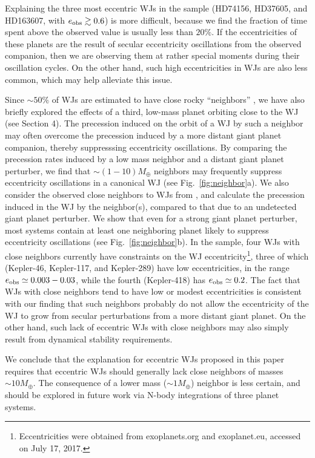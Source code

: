 \documentclass[12pt,useAMS, usenatbib]{mn2e}
\newcommand{\eobs}{e_{\rm obs}}
\begin{document}
Explaining the three most eccentric WJs in the sample (HD74156, HD37605, and HD163607, with $\eobs \gtrsim 0.6$) is more difficult, because we find the fraction of time spent above the observed value is usually less than $20 \%$.  If the eccentricities of these planets are the result of secular eccentricity oscillations from the observed companion, then we are observing them at rather special moments during their oscillation cycles.  On the other hand, such high eccentricities in WJs are also less common, which may help alleviate this issue. 

Since $\sim 50 \%$ of WJs are estimated to have close rocky ``neighbors'' \citep{huang2016},  we have also briefly explored the effects of a third, low-mass planet orbiting close to the WJ (see Section 4).  The precession induced on the orbit of a WJ by such a neighbor may often overcome the precession induced by a more distant giant planet companion, thereby suppresssing eccentricity oscillations.  By comparing the precession rates induced by a low mass neighbor and a distant giant planet perturber, we find that $\sim (1 - 10) M_{\oplus}$ neighbors may frequently suppress eccentricity oscillations in a canonical WJ (see Fig.~\ref{fig:neighbor}a).  We also consider the observed close neighbors to WJs from \cite{huang2016},  and calculate the precession induced in the WJ by the neighbor(s), compared to that due to an undetected giant planet perturber.  We show that even for a strong giant planet perturber, most systems contain at least one neighboring planet likely to suppress eccentricity oscillations (see Fig.~\ref{fig:neighbor}b).   In the \cite{huang2016} sample, four WJs with close neighbors currently have constraints on the WJ eccentricity\footnote{Eccentricities were obtained from exoplanets.org and exoplanet.eu, accessed on July 17, 2017.}, three of which (Kepler-46, Kepler-117, and Kepler-289) have low eccentricities, in the range $\eobs \simeq 0.003 - 0.03$, while the fourth (Kepler-418) has $\eobs \simeq 0.2$.  The fact that WJs with close neighbors tend to have low or modest eccentricities is consistent with our finding that such neighbors probably do not allow the eccentricity of the WJ to grow from secular perturbations from a more distant giant planet.  On the other hand, such lack of eccentric WJs with close neighbors may also simply result from dynamical stability requirements.   

We conclude that the explanation for eccentric WJs proposed in this paper requires that eccentric WJs should generally lack close neighbors of masses $\sim 10 M_{\oplus}$.  The consequence of a lower mass ($\sim 1 M_{\oplus}$) neighbor is less certain, and should be explored in future work via N-body integrations of three planet systems. 
\end{document}
